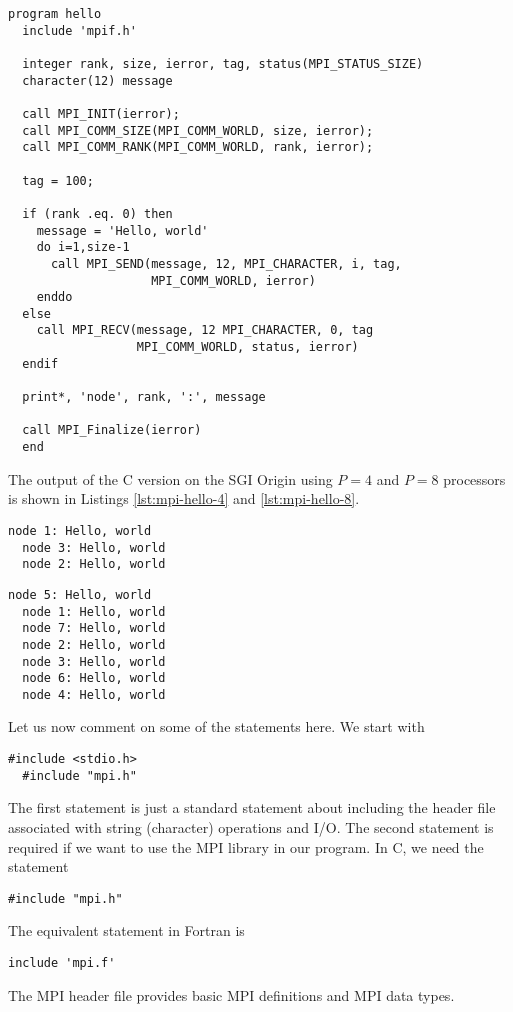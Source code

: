 \begin{lstlisting}[style=fortran, float, caption={Hello world MPI in Fortran.}, label=lst:mpi-hello-fortran]
  program hello
  include 'mpif.h'

  integer rank, size, ierror, tag, status(MPI_STATUS_SIZE)
  character(12) message

  call MPI_INIT(ierror);
  call MPI_COMM_SIZE(MPI_COMM_WORLD, size, ierror);
  call MPI_COMM_RANK(MPI_COMM_WORLD, rank, ierror);

  tag = 100;

  if (rank .eq. 0) then
    message = 'Hello, world'
    do i=1,size-1
      call MPI_SEND(message, 12, MPI_CHARACTER, i, tag,
                    MPI_COMM_WORLD, ierror)
    enddo
  else
    call MPI_RECV(message, 12 MPI_CHARACTER, 0, tag
                  MPI_COMM_WORLD, status, ierror)
  endif

  print*, 'node', rank, ':', message

  call MPI_Finalize(ierror)
  end
\end{lstlisting}

The output of the C version on the SGI Origin using $P=4$ and $P=8$ processors
is shown in Listings \ref{lst:mpi-hello-4} and \ref{lst:mpi-hello-8}.

\begin{lstlisting}[float, caption={Hello world MPI in C: $4$ processors.}, label=lst:mpi-hello-4]
  node 1: Hello, world
  node 3: Hello, world
  node 2: Hello, world
\end{lstlisting}

\begin{lstlisting}[float, caption={Hello world MPI in C: $8$ processors.}, label=lst:mpi-hello-8]
  node 5: Hello, world
  node 1: Hello, world
  node 7: Hello, world
  node 2: Hello, world
  node 3: Hello, world
  node 6: Hello, world
  node 4: Hello, world
\end{lstlisting}

Let us now comment on some of the statements here. We start with
\begin{lstlisting}[style=c]
  #include <stdio.h>
  #include "mpi.h"
\end{lstlisting}
The first statement is just a standard statement about including the header file
associated with string (character) operations and I/O. The second statement is
required if we want to use the MPI library in our program. In C, we need the
statement
\begin{lstlisting}[style=c]
  #include "mpi.h"
\end{lstlisting}
The equivalent statement in Fortran is
\begin{lstlisting}[style=fortran]
  include 'mpi.f'
\end{lstlisting}
The MPI header file provides basic MPI definitions and MPI data types.

